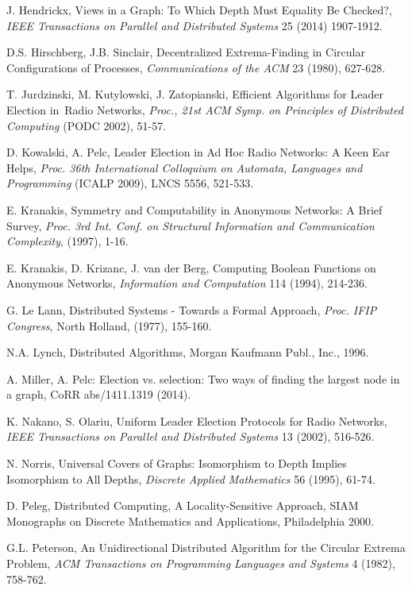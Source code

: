 \documentclass[a4paper,10pt]{article}
\begin{document}
\begin{thebibliography}{99}
J. Hendrickx, Views in a Graph: To Which Depth Must Equality Be Checked?,
{\em IEEE Transactions on Parallel and Distributed Systems} 25 (2014) 1907-1912.


D.S. Hirschberg, J.B. Sinclair,
Decentralized Extrema-Finding in Circular Configurations of Processes,
{\em Communications of the ACM} 23 (1980), 627-628.

T. Jurdzinski, M. Kutylowski, J. Zatopianski, 
Efficient Algorithms for Leader Election in~Radio Networks,
 {\em Proc., 21st ACM Symp. on Principles of Distributed Computing} (PODC 2002), 51-57.

D. Kowalski, A. Pelc, Leader Election in Ad Hoc Radio Networks: A Keen Ear Helps, 
{\em Proc. 36th International Colloquium on Automata, Languages and Programming} (ICALP 2009), LNCS 5556, 521-533. 


E. Kranakis,
Symmetry and Computability in Anonymous Networks: A Brief Survey,
{\em Proc. 3rd Int. Conf. on Structural Information and Communication Complexity}, (1997), 1-16.

E. Kranakis, D. Krizanc, J. van der Berg,
Computing Boolean Functions on Anonymous Networks,
{\em Information and Computation} 114 (1994), 214-236.

G. Le Lann,
Distributed Systems - Towards a Formal Approach,
{\em Proc. IFIP Congress}, North Holland, (1977), 155-160.

N.A. Lynch, 
Distributed Algorithms,
Morgan Kaufmann Publ., Inc., 1996.


A. Miller, A. Pelc: Election vs. selection: Two ways of finding the largest node in a graph,
CoRR abs/1411.1319 (2014).

K. Nakano, S. Olariu, Uniform Leader Election Protocols for Radio Networks,
{\em IEEE Transactions on Parallel and Distributed Systems} 13
(2002), 516-526.

N. Norris, Universal Covers of Graphs: Isomorphism to Depth  Implies Isomorphism to All Depths,
{\em Discrete Applied Mathematics} 56 (1995), 61-74.
               
D. Peleg,
Distributed Computing, A Locality-Sensitive Approach,
SIAM Monographs on Discrete Mathematics and Applications, Philadelphia 2000.

G.L. Peterson, An  Unidirectional Distributed Algorithm for the Circular Extrema Problem,
{\em ACM Transactions on Programming Languages and Systems} 4 (1982), 758-762.


\end{thebibliography}
\end{document}
